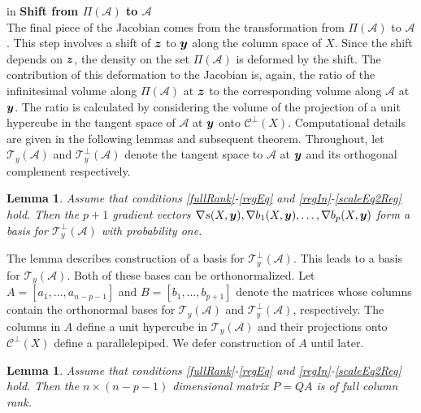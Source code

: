 \documentclass[12pt]{article}
\newcommand{\by}{\mbox{\boldmath $y$}}
\newcommand{\bz}{\mbox{\boldmath $z$}}
\newcommand{\mc}{\mathcal}
\newtheorem{lemma}[theorem]{\bf Lemma}
\begin{document}
 in
\noindent
{\bf Shift from $\Pi(\mathcal{A})$ to $\mathcal{A}$} \\
The final piece of the Jacobian comes from the transformation from
$\Pi(\mathcal{A})$ to $\mathcal{A}$.  %
This step involves a shift of
$\bz$ to $\by$ along the column space of $X$. Since the shift depends on 
$\bz$, the density on the set 
$\Pi(\mathcal{A})$ is deformed by the shift. The
contribution of this deformation to the Jacobian is, again,
the ratio of the infinitesimal volume along $\Pi(\mathcal{A})$ at $\bz$ to the
corresponding volume along $\mathcal{A}$ at $\by$. 
The ratio is calculated by considering the volume of the
projection of a unit hypercube in the tangent space of $\mathcal{A}$
at $\by$ onto $\mc{C}^\perp(X)$.
Computational details are
given in the following lemmas and subsequent theorem. Throughout, let
$\mc T_{y}(\mc A)$ and $\mc T_{y}^{\perp}(\mc A)$ denote the tangent
space to $\mc A$ at $\by$ and its orthogonal complement respectively. 

\begin{lemma}
\label{lem:basis}
Assume that conditions \ref{fullRank}-\ref{regEq} and \ref{regIn}-\ref{scaleEq2Reg} hold.  Then the $p+1$ gradient vectors 
$\nabla s(X,\by), \nabla b_1(X,\by),\dots, \nabla b_p(X,\by)$ form a
basis for $\mc T_{y}^\perp(\mc A)$ with probability one.
\end{lemma}

The lemma describes construction of a basis for $\mc T_{y}^\perp(\mc A)$.  This leads to a 
basis for $\mc T_{y}(\mc A)$.  Both of these bases can be orthonormalized.  
Let $A=[a_{1},\dots,a_{n-p-1}]$  and $B=[b_1,\dots,b_{p+1}]$ denote the 
matrices whose columns contain the orthonormal bases for  $\mc T_{y}(\mc A)$ and  $\mc T^{\perp}_{y}(\mc A)$, respectively.  
The columns in $A$ define a unit hypercube in $\mc T_{y}(\mc
  A)$ and their projections onto $\mc{C}^\perp(X)$ define a parallelepiped.
We defer construction of $A$ until later. 

\begin{lemma}
\label{lem:fullrank}
Assume that conditions \ref{fullRank}-\ref{regEq} and \ref{regIn}-\ref{scaleEq2Reg} hold.  
Then the $n\times (n-p-1)$ dimensional matrix $P=QA$ is of full column rank.
\end{lemma}
\end{document}
